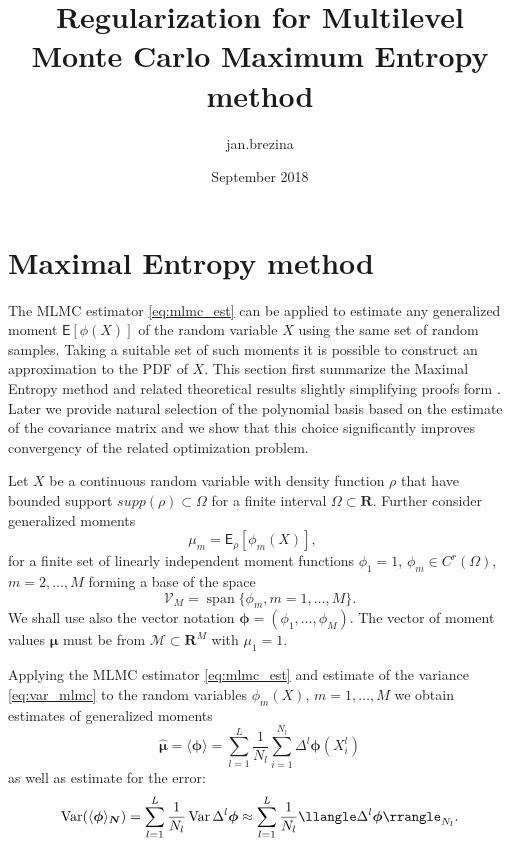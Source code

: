 \documentclass{article}
\title{Regularization for Multilevel Monte Carlo Maximum Entropy method}
\author{jan.brezina }
\date{September 2018}
\def\vc#1{\mathbf{\boldsymbol{#1}}}     %
\def \E{{\mathsf E}}
\def\R{\mathbf{R}}
\def\avg#1{\langle#1\rangle}
\def\var#1{\llangle#1\rrangle}
\def\Var{\mathop{\rm Var}}
\DeclareMathOperator{\Span}{span}
\begin{document}
\maketitle



\section{Maximal Entropy method}
\def\vl{{\vc\lambda}}
\def\estvl{{\vc{\hat\lambda}}}
\def\estrho{\hat\rho}
\def\vmu{\vc\mu}
\def\estvmu{{\vc{\hat\mu}}}
\def\vphi{\vc\phi}

The MLMC  estimator \eqref{eq:mlmc_est} can be applied to estimate any generalized moment $\E[\phi(X)]$ 
of the random variable $X$ using the same set of random samples. Taking a suitable 
set of such moments it is possible to construct an approximation to the PDF of $X$. This section first
summarize the Maximal Entropy method and related theoretical results slightly simplifying proofs form \cite{Barron1991}. Later we provide natural selection of the polynomial basis based on the estimate of the covariance matrix and we show that this choice significantly improves convergency of the related optimization problem.

Let $X$ be a continuous random variable with density function $\rho$ that have bounded support
$supp(\rho) \subset \Omega$ for a finite interval $\Omega \subset \R$. Further consider generalized moments
\begin{equation}
    \label{eq:gen_moments}
    \mu_m = \E_{\rho}[\phi_m(X)], \quad 
\end{equation}
for a finite set of linearly independent moment functions $\phi_1=1$, $\phi_m\in C^r(\Omega)$, $m=2,\dots, M$ forming a base of the space
\[
    \mathcal V_M = \Span\{\phi_m, m=1,\dots, M\}.
\] 
We shall use also the vector notation $\vphi = (\phi_1, \dots,\phi_M)$. The vector of moment values
$\vmu$ must be from $\mathcal M \subset \R^M$ with $\mu_1 = 1$.

Applying the MLMC estimator \eqref{eq:mlmc_est} and estimate of the variance \eqref{eq:var_mlmc} 
to the random variables $\phi_m(X)$, $m=1,\dots, M$ we obtain estimates of generalized moments
\begin{equation}
    \label{eq:mlmc_est_moments}
    \estvmu = \avg{\vphi} = \sum_{l=1}^L \frac{1}{N_l} \sum_{i=1}^{N_l} \Delta^l\vphi(X_i^l)
\end{equation}
as well as estimate for the error:
\[
    \Var(\avg{\vphi}_{\vc N}) =  \sum_{l=1}^{L} \frac{1}{N_l} \Var{\Delta^l\vphi} 
    \approx \sum_{l=1}^{L} \frac{1}{N_l} \var{\Delta^l\vphi}_{N_l}.
\]
\end{document}
